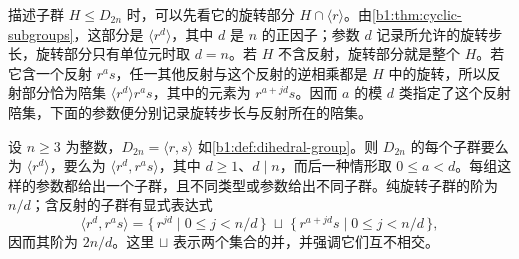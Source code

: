 描述子群 \(H\leq D_{2n}\) 时，可以先看它的旋转部分 \(H\cap\langle r\rangle\)。由\cref{b1:thm:cyclic-subgroups}，这部分是 \(\langle r^d\rangle\)，其中 \(d\) 是 \(n\) 的正因子；参数 \(d\) 记录所允许的旋转步长，旋转部分只有单位元时取 \(d=n\)。若 \(H\) 不含反射，旋转部分就是整个 \(H\)。若它含一个反射 \(r^as\)，任一其他反射与这个反射的逆相乘都是 \(H\) 中的旋转，所以反射部分恰为陪集 \(\langle r^d\rangle r^as\)，其中的元素为 \(r^{a+jd}s\)。因而 \(a\) 的模 \(d\) 类指定了这个反射陪集，下面的参数便分别记录旋转步长与反射所在的陪集。

\begin{samepage}
	\begin{proposition}\label{b1:prop:dihedral-subgroups}
		设 \(n\geq3\) 为整数，\(D_{2n}=\langle r,s\rangle\) 如\cref{b1:def:dihedral-group}。则 \(D_{2n}\) 的每个子群要么为 \(\langle r^d\rangle\)，要么为 \(\langle r^d,r^as\rangle\)，其中 \(d\geq1\)、\(d\mid n\)，而后一种情形取 \(0\leq a<d\)。每组这样的参数都给出一个子群，且不同类型或参数给出不同子群。纯旋转子群的阶为 \(n/d\)；含反射的子群有显式表达式
		\begin{equation}\label{b1:eq:dihedral-subgroup-elements}
			\langle r^d,r^as\rangle =\{\,r^{jd}\mid0\leq j<n/d\,\} \;\sqcup\; \{\,r^{a+jd}s\mid0\leq j<n/d\,\},
		\end{equation}
		因而其阶为 \(2n/d\)。这里 \(\sqcup\) 表示两个集合的并，并强调它们互不相交。
	\end{proposition}
\end{samepage}
